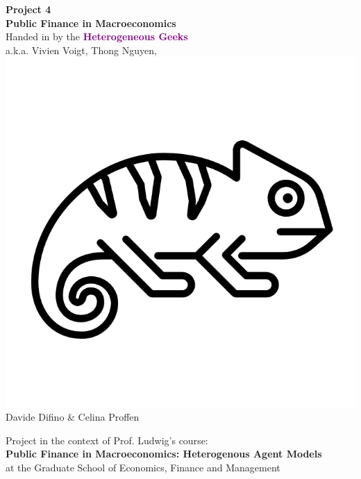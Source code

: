 \documentclass[12pt,a4paper]{article}
\begin{document}
\begin{center}
       \vspace*{1cm}
       \huge\textbf{Project 4} \\
       \vspace{0.4cm}
       \large \textbf{Public Finance in Macroeconomics} \\
       \vspace{0.5cm}
        \large Handed in by the \textcolor{purple}{\textbf{Heterogeneous Geeks}} \\
        \vspace{0.3cm}
        a.k.a. Vivien Voigt, Thong Nguyen, \includegraphics[scale=0.06]{graphs/geek.png}\\Davide Difino \& Celina Proffen \\
       \vspace{1.5cm}
       \vfill



        Project in the context of Prof. Ludwig's course: \\
        \textbf{Public Finance in Macroeconomics: Heterogenous Agent Models}\\
        at the Graduate School of Economics, Finance and Management
       \vspace{0.8cm}
   \end{center}
\end{document}
